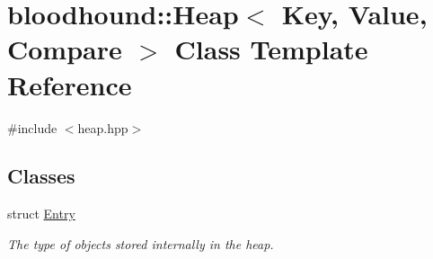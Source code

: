 \hypertarget{classbloodhound_1_1Heap}{}\section{bloodhound\+:\+:Heap$<$ Key, Value, Compare $>$ Class Template Reference}
\label{classbloodhound_1_1Heap}


{\ttfamily \#include $<$heap.\+hpp$>$}

\subsection*{Classes}
\begin{DoxyCompactItemize}
\item 
struct \hyperlink{structbloodhound_1_1Heap_1_1Entry}{Entry}
\begin{DoxyCompactList}\small\item\em The type of objects stored internally in the heap. \end{DoxyCompactList}\end{DoxyCompactItemize}
